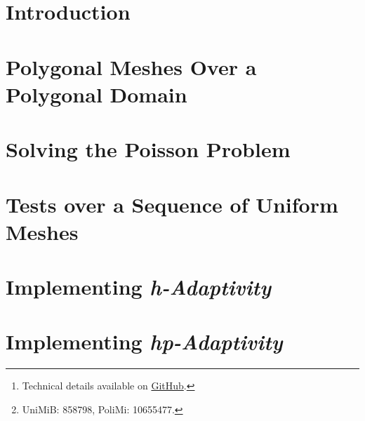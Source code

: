 \documentclass[12pt, twoside]{article}
\title{\reporttitle}
\author{Andrea Di Antonio\footnote{UniMiB: 858798, PoliMi: 10655477.}} %
\date{Exam session of July, 2024 \\ Academic Year 2023-24}
\begin{document}
	\maketitle
	\thispagestyle{fancy}

	\begin{abstract}
		\begin{center}
			Report for the course \textit{Advanced Programming for Scientific Computing} on the implementation details\footnote{Technical details available on \href{https://github.com/diantonioandrea/pacs-project}{GitHub}.} of the \textit{hp-adaptive} discontinuous Galërkin method applied to the Poisson problem. This report covers the main aspects of the project, including mesh generation, problem solution, and the implementation of \textit{hp-adaptivity}.
		\end{center}
	\end{abstract}

	\newpage
	\tableofcontents

	\newpage
    \section{Introduction}
	

	\newpage
    \section{Polygonal Meshes Over a Polygonal Domain}
	

	\newpage
    \section{Solving the Poisson Problem}
	

	\newpage
    \section{Tests over a Sequence of Uniform Meshes}
	

	\newpage
    \section{Implementing \textit{h-Adaptivity}}
	

	\newpage
    \section{Implementing \textit{hp-Adaptivity}}
	

	\newpage
	
	
\end{document}
